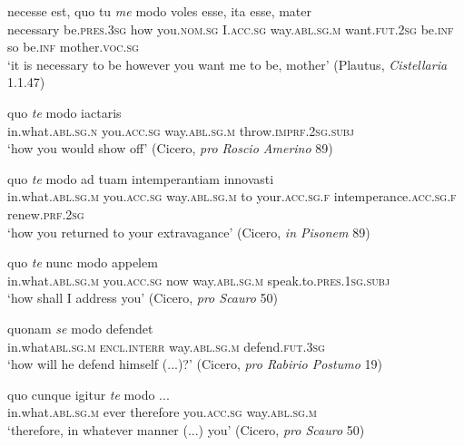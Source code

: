 \begin{exe}
\ex
\gll necesse est, quo tu \emph{me} modo voles esse, ita esse, mater\\
necessary be.\textsc{pres.3sg} how you.\textsc{nom.sg} I.\textsc{acc.sg} way.\textsc{abl.sg.m} want.\textsc{fut.2sg} be.\textsc{inf} so be.\textsc{inf} mother.\textsc{voc.sg}\\
\trans `it is necessary to be however you want me to be, mother' (Plautus, \textit{Cistellaria} 1.1.47)
\label{quomodo1}
\end{exe}

\begin{exe}
\ex
\gll quo \emph{te} modo iactaris\\
in.what.\textsc{abl.sg.n} you.\textsc{acc.sg} way.\textsc{abl.sg.m} throw.\textsc{imprf.2sg.subj}\\
\trans `how you would show off' (Cicero, \textit{pro Roscio Amerino} 89)
\label{quomodo2}
\end{exe}

\begin{exe}
\ex
\gll quo \emph{te} modo ad tuam intemperantiam innovasti\\
in.what.\textsc{abl.sg.m} you.\textsc{acc.sg} way.\textsc{abl.sg.m} to your.\textsc{acc.sg.f} intemperance.\textsc{acc.sg.f} renew.\textsc{prf.2sg}\\
\trans `how you returned to your extravagance' (Cicero, \textit{in Pisonem} 89)
\label{quomodo3}
\end{exe}

\begin{exe}
\ex
\gll quo \emph{te} nunc modo appelem\\
in.what.\textsc{abl.sg.m} you.\textsc{acc.sg} now way.\textsc{abl.sg.m} speak.to.\textsc{pres.1sg.subj}\\
\trans `how shall I address you' (Cicero, \textit{pro Scauro} 50)
\label{quomodo4}
\end{exe}

\begin{exe}
\ex
\gll quonam \emph{se} modo defendet\\
in.what\textsc{abl.sg.m} \textsc{encl.interr} way.\textsc{abl.sg.m} defend.\textsc{fut.3sg}\\
\trans `how will he defend himself (...)?' (Cicero, \textit{pro Rabirio Postumo} 19)
\label{quomodo5}
\end{exe}%

\begin{exe}
\ex
\gll quo cunque igitur \emph{te} modo ...\\
in.what.\textsc{abl.sg.m} ever therefore you.\textsc{acc.sg} way.\textsc{abl.sg.m} ~\\
\trans `therefore, in whatever manner (...) you' (Cicero, \textit{pro Scauro} 50)
\label{quomodo6}
\end{exe}%

